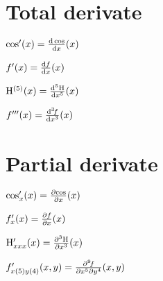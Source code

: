 \documentclass[a4paper,10pt]{article}
\makeatletter
\DeclareRobustCommand{\dder}{
		\mathop{}\mathopen{}\mathrm{d}
	}
\let\original@partial\partial
\renewcommand{\partial}{
			\original@partial\mathopen{}
		}
\newcommand{\pp}[2][0]{
		\ifnum#1=0
			\partial #2
		\else
			\IfBeginWith{#2}{f}{
				\partial^{#1} \! #2
			}{
				\partial^{#1}  #2
			}
		\fi
	}
\newcommand{\dd}[2][0]{
		\ifnum#1=0
			\dder #2
		\else
			\IfBeginWith{#2}{f}{
				\dder^{#1} \! #2
			}{
				\dder^{#1}  #2
			}
		\fi
	}
\makeatother
\begin{document}
	\setlength{\parindent}{0pt}
	\newcommand{\HH}{
		\mathrm{H}
	}


	\section{Total derivate}

	$ \cos'(x) = \frac{\dd{\cos}}{\dd{x}} (x) $


	$ f'(x) = \frac{\dd{f}}{\dd{x}} (x) $


	$ \HH^{(5)}(x) = \frac{\dd[5]{\HH}}{\dd{x}^{5}} (x) $


	$ f'''(x) = \frac{\dd[3]{f}}{\dd{x}^{3}} (x) $


	\section{Partial derivate}

	$ \cos'_{x} (x) = \frac{\pp{\cos}}{\pp{x}} (x) $


	$ f'_{x} (x) = \frac{\pp{f}}{\pp{x}} (x) $


	$ \HH'_{xxx} (x) = \frac{\pp[3]{\HH}}{\pp{x}^{3}} (x) $


	$ f'_{x(5) y(4)} (x,y) = \frac{\pp[9]{f}}{\pp{x}^{5} \pp{y}^{4}} (x,y)$
\end{document}
